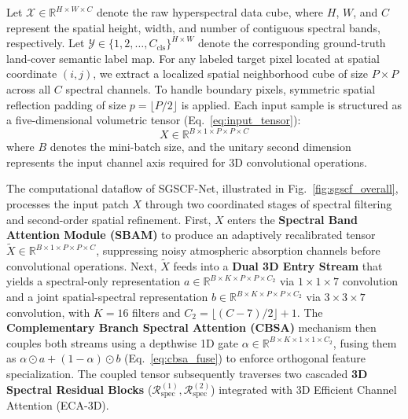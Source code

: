 \documentclass[manuscript,screen,review]{acmart}
\begin{document}
Let $\mathcal{X} \in \mathbb{R}^{H \times W \times C}$ denote the raw hyperspectral data cube, where $H$, $W$, and $C$ represent the spatial height, width, and number of contiguous spectral bands, respectively. Let $\mathcal{Y} \in \{1, 2, \dots, C_{\text{cls}}\}^{H \times W}$ denote the corresponding ground-truth land-cover semantic label map. For any labeled target pixel located at spatial coordinate $(i, j)$, we extract a localized spatial neighborhood cube of size $P \times P$ across all $C$ spectral channels. To handle boundary pixels, symmetric spatial reflection padding of size $p = \lfloor P / 2 \rfloor$ is applied. Each input sample is structured as a five-dimensional volumetric tensor (Eq.~\ref{eq:input_tensor}):
\begin{equation}
\label{eq:input_tensor}
X \in \mathbb{R}^{B \times 1 \times P \times P \times C}
\end{equation}
where $B$ denotes the mini-batch size, and the unitary second dimension represents the input channel axis required for 3D convolutional operations.

The computational dataflow of SGSCF-Net, illustrated in Fig.~\ref{fig:sgscf_overall}, processes the input patch $X$ through two coordinated stages of spectral filtering and second-order spatial refinement. First, $X$ enters the \textbf{Spectral Band Attention Module (SBAM)} to produce an adaptively recalibrated tensor $\tilde{X} \in \mathbb{R}^{B \times 1 \times P \times P \times C}$, suppressing noisy atmospheric absorption channels before convolutional operations. Next, $\tilde{X}$ feeds into a \textbf{Dual 3D Entry Stream} that yields a spectral-only representation $a \in \mathbb{R}^{B \times K \times P \times P \times C_2}$ via $1\times 1\times 7$ convolution and a joint spatial-spectral representation $b \in \mathbb{R}^{B \times K \times P \times P \times C_2}$ via $3\times 3\times 7$ convolution, with $K=16$ filters and $C_2 = \lfloor(C-7)/2\rfloor + 1$. The \textbf{Complementary Branch Spectral Attention (CBSA)} mechanism then couples both streams using a depthwise 1D gate $\alpha \in \mathbb{R}^{B \times K \times 1 \times 1 \times C_2}$, fusing them as $\alpha \odot a + (1-\alpha) \odot b$ (Eq.~\ref{eq:cbsa_fuse}) to enforce orthogonal feature specialization. The coupled tensor subsequently traverses two cascaded \textbf{3D Spectral Residual Blocks} ($\mathcal{R}_{\text{spec}}^{(1)}, \mathcal{R}_{\text{spec}}^{(2)}$) integrated with 3D Efficient Channel Attention (ECA-3D).
\end{document}
